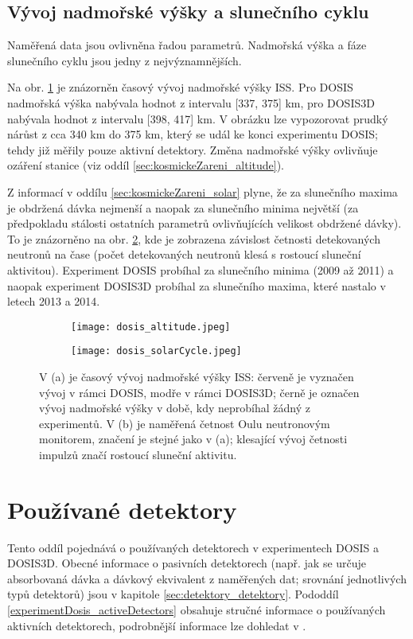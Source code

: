\subsection{Vývoj nadmořské výšky a slunečního cyklu}\label{sec:dosis_altitudeSlunecniCyklus} %
Naměřená data jsou ovlivněna řadou parametrů. Nadmořská výška a fáze slunečního cyklu jsou jedny z nejvýznamnějších. 

Na obr. \ref{subfig:dosis_altitude} je znázorněn časový vývoj nadmořské výšky ISS. Pro DOSIS nadmořská výška nabývala hodnot z intervalu [337, 375] km, pro DOSIS3D nabývala hodnot z intervalu [398, 417] km. V obrázku lze vypozorovat prudký nárůst z cca 340 km do 375 km, který se udál ke konci experimentu DOSIS; tehdy již měřily pouze aktivní detektory. Změna nadmořské výšky ovlivňuje ozáření stanice (viz oddíl \ref{sec:kosmickeZareni_altitude}). 

Z informací v oddílu \ref{sec:kosmickeZareni_solar} plyne, že za slunečního maxima je obdržená dávka nejmenší a naopak za slunečního minima největší (za předpokladu stálosti ostatních parametrů ovlivňujících velikost obdržené dávky). To je znázorněno na obr. \ref{subfig:dosis_solarCycle}, kde je zobrazena závislost četnosti detekovaných neutronů na čase (počet detekovaných neutronů klesá s rostoucí sluneční aktivitou). Experiment DOSIS probíhal za slunečního minima (2009 až 2011) a naopak experiment DOSIS3D probíhal za slunečního maxima, které nastalo v letech 2013 a 2014.   
\begin{figure}[h]
  \centering
  \begin{subfigure}{0.45\textwidth}
	\texttt{[image: dosis\_altitude.jpeg]}
	\caption{}
	\label{subfig:dosis_altitude}
  \end{subfigure}
  \begin{subfigure}{0.45\textwidth}
	\texttt{[image: dosis\_solarCycle.jpeg]}
	\caption{}
	\label{subfig:dosis_solarCycle}
  \end{subfigure}
  \caption{V (a) je časový vývoj nadmořské výšky ISS: červeně je vyznačen vývoj v rámci DOSIS, modře v rámci DOSIS3D; černě je označen vývoj nadmořské výšky v době, kdy neprobíhal žádný z experimentů. V (b) je naměřená četnost Oulu neutronovým monitorem, značení je stejné jako v (a); klesající vývoj četnosti impulzů značí rostoucí sluneční aktivitu. \cite{dosis,dosis_oulu}} 
  \label{fig:dosis_parameters}
\end{figure}

\section{Používané detektory}%
Tento oddíl pojednává o používaných detektorech v experimentech DOSIS a DOSIS3D. Obecné informace o pasivních detektorech (např. jak se určuje absorbovaná dávka a dávkový ekvivalent z naměřených dat; srovnání jednotlivých typů detektorů) jsou v kapitole \ref{sec:detektory_detektory}. Pododdíl \ref{experimentDosis_activeDetectors} obsahuje stručné informace o používaných aktivních detektorech, podrobnější informace lze dohledat v \cite{activeDetectors,dosis2}.


